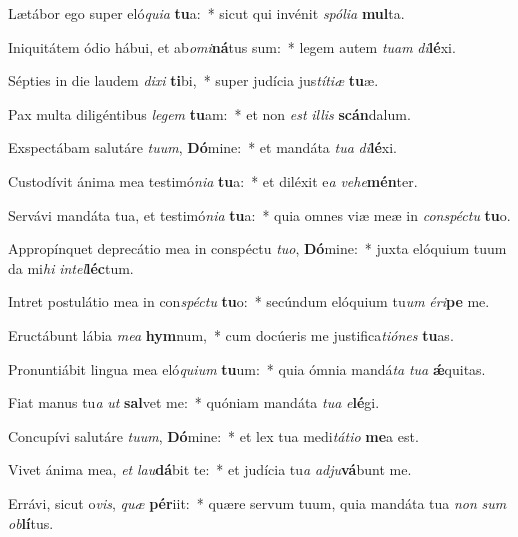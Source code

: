 \item Lætábor ego super eló\textit{qui}\textit{a} \textbf{tu}a:~* sicut qui invénit \textit{spó}\textit{li}\textit{a} \textbf{mul}ta.
\item Iniquitátem ódio hábui, et ab\textit{o}\textit{mi}\textbf{ná}tus sum:~* legem autem \textit{tu}\textit{am} \textit{di}\textbf{lé}xi.
\item Sépties in die laudem \textit{di}\textit{xi} \textbf{ti}bi,~* super judícia jus\textit{tí}\textit{ti}\textit{æ} \textbf{tu}æ.
\item Pax multa diligéntibus \textit{le}\textit{gem} \textbf{tu}am:~* et non \textit{est} \textit{il}\textit{lis} \textbf{scán}dalum.
\item Exspectábam salutáre \textit{tu}\textit{um}, \textbf{Dó}mine:~* et mandáta \textit{tu}\textit{a} \textit{di}\textbf{lé}xi.
\item Custodívit ánima mea testimó\textit{ni}\textit{a} \textbf{tu}a:~* et diléxit e\textit{a} \textit{ve}\textit{he}\textbf{mén}ter.
\item Servávi mandáta tua, et testimó\textit{ni}\textit{a} \textbf{tu}a:~* quia omnes viæ meæ in \textit{con}\textit{spéc}\textit{tu} \textbf{tu}o.
\item Appropínquet deprecátio mea in conspéctu \textit{tu}\textit{o}, \textbf{Dó}mine:~* juxta elóquium tuum da mi\textit{hi} \textit{in}\textit{tel}\textbf{léc}tum.
\item Intret postulátio mea in con\textit{spéc}\textit{tu} \textbf{tu}o:~* secúndum elóquium tu\textit{um} \textit{é}\textit{ri}\textbf{pe} me.
\item Eructábunt lábia \textit{me}\textit{a} \textbf{hym}num,~* cum docúeris me justifica\textit{ti}\textit{ó}\textit{nes} \textbf{tu}as.
\item Pronuntiábit lingua mea eló\textit{qui}\textit{um} \textbf{tu}um:~* quia ómnia mandá\textit{ta} \textit{tu}\textit{a} \textbf{ǽ}quitas.
\item Fiat manus tu\textit{a} \textit{ut} \textbf{sal}vet me:~* quóniam mandáta \textit{tu}\textit{a} \textit{e}\textbf{lé}gi.
\item Concupívi salutáre \textit{tu}\textit{um}, \textbf{Dó}mine:~* et lex tua medi\textit{tá}\textit{ti}\textit{o} \textbf{me}a est.
\item Vivet ánima mea, \textit{et} \textit{lau}\textbf{dá}bit te:~* et judícia tu\textit{a} \textit{ad}\textit{ju}\textbf{vá}bunt me.
\item Errávi, sicut o\textit{vis}, \textit{quæ} \textbf{pér}iit:~* quære servum tuum, quia mandáta tua \textit{non} \textit{sum} \textit{ob}\textbf{lí}tus.
